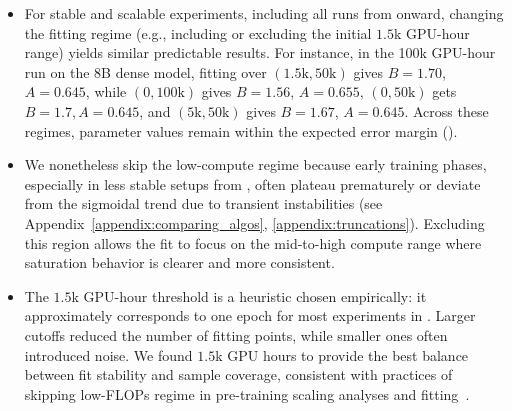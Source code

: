 \begin{itemize}
    \item For stable and scalable experiments, including all runs from  onward, changing the fitting regime (e.g., including or excluding the initial $1.5$k GPU-hour range) yields similar predictable results.
    For instance, in the 100k GPU-hour run on the 8B dense model, fitting over $(1.5\text{k}, 50\text{k})$ gives $B = 1.70$, $A = 0.645$, while $(0, 100\text{k})$ gives $B = 1.56$, $A = 0.655$, $(0, 50\text{k})$ gets $B=1.7, A=0.645$, and $(5\text{k}, 50\text{k})$ gives $B = 1.67$, $A = 0.645$. Across these regimes, parameter values remain within the expected error margin ().

    \item We nonetheless skip the low-compute regime because early training phases, especially in less stable setups from , often plateau prematurely or deviate from the sigmoidal trend due to transient instabilities (see Appendix~\ref{appendix:comparing_algos}, \ref{appendix:truncations}).
    Excluding this region allows the fit to focus on the mid-to-high compute range where saturation behavior is clearer and more consistent.

    \item The $1.5$k GPU-hour threshold is a heuristic chosen empirically: it approximately corresponds to one epoch for most experiments in .
    Larger cutoffs reduced the number of fitting points, while smaller ones often introduced noise.
    We found $1.5$k GPU hours to provide the best balance between fit stability and sample coverage, consistent with practices of skipping low-FLOPs regime in pre-training scaling analyses and fitting~\citep{misfitting}.

\end{itemize}

